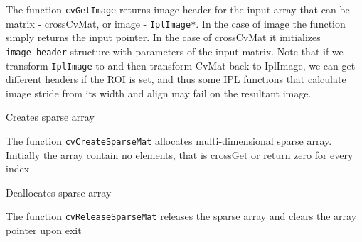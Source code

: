 \begin{description}
\end{description}

The function \texttt{cvGetImage} returns image header for the input array
that can be matrix - cross{CvMat}, or image - \texttt{IplImage*}. In
the case of image the function simply returns the input pointer. In the
case of cross{CvMat} it initializes \texttt{image\_header} structure
with parameters of the input matrix. Note that if we transform
\texttt{IplImage} to  and then transform CvMat back to
IplImage, we can get different headers if the ROI is set, and thus some
IPL functions that calculate image stride from its width and align may
fail on the resultant image.

\label{CreateSparseMat}

Creates sparse array


\begin{description}
\end{description}

The function \texttt{cvCreateSparseMat} allocates multi-dimensional sparse array. Initially the array contain no elements, that is cross{Get} or  return zero for every index

\label{ReleaseSparseMat}

Deallocates sparse array


\begin{description}
\end{description}


The function \texttt{cvReleaseSparseMat} releases the sparse array and clears the array pointer upon exit


\label{CloneSparseMat}

